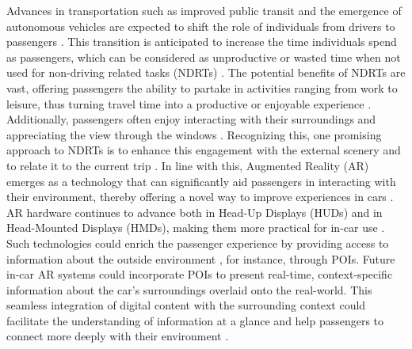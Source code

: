 Advances in transportation such as improved public transit and the emergence of autonomous vehicles are expected to shift the role of individuals from drivers to passengers \cite{McGill2022MRPassengerXP, MatsumuraActivePassengering18}.
%
This transition is anticipated to increase the time individuals spend as passengers, which can be considered as unproductive or wasted time when not used for non-driving related tasks (NDRTs) \cite{gardner2007drives, watts2008moving, wilfinger2011we}.
%
The potential benefits of NDRTs are vast, offering passengers the ability to partake in activities ranging from work to leisure, thus turning travel time into a productive or enjoyable experience \cite{Mathis2021work, medeiros2022shielding, Togwell2022gaming, Pfleging16NDRNeeds, Riegler19WindshieldArNDRT}. Additionally, passengers often enjoy interacting with their surroundings and appreciating the view through the windows \cite{russell2011passengers, hecht2020ndrts, MatsumuraActivePassengering18,BergerGridStudyInCarPassenger2021}. Recognizing this, one promising approach to NDRTs is to enhance this engagement with the external scenery \cite{MatsumuraActivePassengering18} and to relate it to the current trip \cite{Inbar11TripUX}.
%
In line with this, Augmented Reality (AR) emerges as a technology that can significantly aid passengers in interacting with their environment, thereby offering a novel way to improve experiences in cars \cite{McGill2022MRPassengerXP}. AR hardware continues to advance both in Head-Up Displays (HUDs) and in Head-Mounted Displays (HMDs), making them more practical for in-car use \cite{riegler2021augmented, Elhattab23AutomotiveAR, Goedicke2022xroom}. Such technologies could enrich the passenger experience by providing access to information about the outside environment \cite{BergerGridStudyInCarPassenger2021}, for instance, through POIs.
%
Future in-car AR systems could incorporate POIs to present real-time, context-specific information about the car's surroundings overlaid onto the real-world. This seamless integration of digital content with the surrounding context could facilitate the understanding of information at a glance \cite{haeuslschmid2016design} and help passengers to connect more deeply with their environment \cite{BergerGridStudyInCarPassenger2021, Mehrabian74EnvironmentalPsychology, Pfleging16NDRNeeds, Berger21InteractiveCarDoor}.


